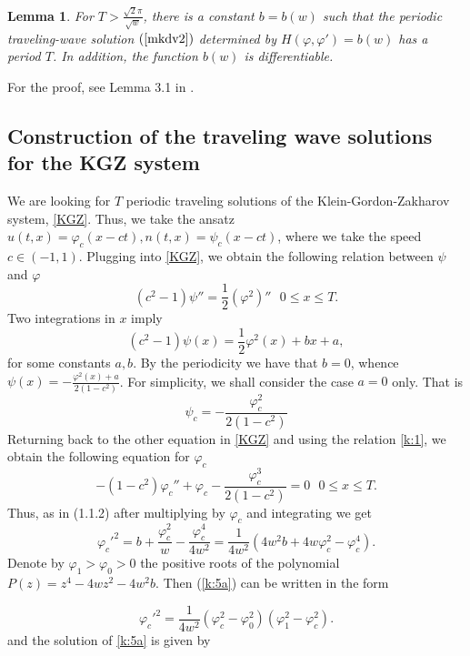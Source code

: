 \documentclass[final,11pt,leqno]{amsart}
\newtheorem{lemma}{Lemma}
\begin{document}
\begin{lemma}\label{lmkdv1}  For  $T>{\frac{{\sqrt{2} \pi}}{{\sqrt{w}}}}$, there is a constant
$b=b(w)$ such that the periodic traveling-wave solution
$(\ref{mkdv2})$ determined by $H(\varphi,\varphi')=b(w)$ has a
period $T$. In addition, the function $b(w)$ is differentiable.
\end{lemma}
For the proof, see Lemma 3.1 in \cite{HaIlKi}.
\subsection{Construction of the traveling wave solutions for the KGZ system}
\label{sec:1.2}
We are looking for $T$ periodic traveling solutions of the Klein-Gordon-Zakharov system, \eqref{KGZ}.  Thus, we take the ansatz $u(t,x)={\varphi}_c(x-c t),
n(t,x)=\psi_c(x-c t)$, where we take the speed $c\in (-1,1)$. Plugging  into \eqref{KGZ}, we obtain the following relation between $\psi$ and ${\varphi}$
$$
(c^2-1) \psi''={\frac{{1}}{{2}}}({\varphi}^2)''\ \ \ 0\leq x\leq T.
$$
Two integrations in $x$  imply
$$
(c^2-1) \psi(x)={\frac{{1}}{{2}}}{\varphi}^2(x)+b x+a,
$$
for some constants $a,b$.
By the periodicity we have that  $b=0$, whence $\psi(x)=-{\frac{{{\varphi}^2(x)+a}}{{2(1-c^2)}}}$. For simplicity, we shall consider the case $a=0$ only. That is
\begin{equation}
\label{k:1}
\psi_c=-{\frac{{{\varphi}_c^2}}{{2(1-c^2)}}}
\end{equation}
Returning back to the other equation in \eqref{KGZ} and using the relation \eqref{k:1}, we obtain the following equation for ${\varphi}_c$
\begin{equation}
\label{k:5}
-(1-c^2) {\varphi}_c''+{\varphi}_c- {\frac{{{\varphi}_c^3}}{{2(1-c^2)}}}=0 \ \ \ 0\leq x\leq T.
\end{equation}
Thus,  as in (1.1.2) after multiplying by ${\varphi}_c$ and integrating we get
  \begin{equation}\label{k:5a}
    {\varphi}_c'^2=b+{\frac{{\varphi}_c^2}{w}}-{\frac{{\varphi}_c^4}{4w^2}}={\frac{1}{4w^2}}(4w^2b+4w{\varphi}_c^2-{\varphi}_c^4).
   \end{equation}
   Denote by ${\varphi}_1>{\varphi}_0>0$ the positive roots of the polynomial $P(z)=z^4-4wz^2-4w^2b.$ Then (\ref{k:5a}) can be written in the form

     \begin{equation}
     \label{k:5b}
       {\varphi}_c'^2={\frac{1}{4w^2}}({\varphi}_c^2-{\varphi}_0^2)({\varphi}_1^2-{\varphi}_c^2).
     \end{equation}
     and the solution of \eqref{k:5a} is given by
\end{document}
